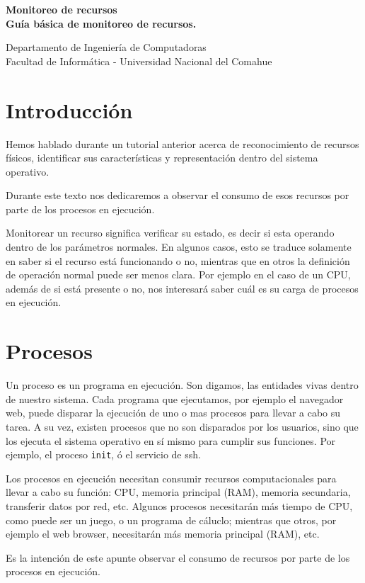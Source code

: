\documentclass[12pt]{article}
\def\maketitle{

 \makeatletter
 {\color{bl} \centering \huge \sc \textbf{
 Monitoreo de recursos \\ 
\large \vspace*{-8pt} \color{black} Guía básica de monitoreo de recursos. 
 \vspace*{8pt} }\par}
 \makeatother


 \makeatletter
 {\centering \small 
 	Departamento de Ingeniería de Computadoras \\
 	Facultad de Informática - Universidad Nacional del Comahue \\
 	\vspace{20pt} }
 \makeatother

}
\begin{document}
\thispagestyle{empty}
\maketitle
\setlength{\parindent}{0pt}

\section*{Introducción}

Hemos hablado durante un tutorial anterior acerca de reconocimiento de recursos 
físicos, identificar sus características y representación dentro del 
sistema operativo.

Durante este texto nos dedicaremos a observar el consumo de esos recursos 
por parte de los procesos en ejecución. 

Monitorear un recurso significa verificar su estado, es decir si esta 
operando dentro de los parámetros normales. En algunos casos, esto se 
traduce solamente en saber si el recurso está funcionando o no, mientras 
que en otros la definición de operación normal puede ser menos clara. 
Por ejemplo en el caso de un CPU, además de si está presente o no, nos 
interesará saber cuál es su carga de procesos en ejecución. 


\section*{Procesos}

Un proceso es un programa en ejecución. Son digamos, las entidades vivas 
dentro de nuestro sistema. Cada programa que ejecutamos, por ejemplo el 
navegador web, puede disparar la ejecución de uno o mas procesos para 
llevar a cabo su tarea.  A su vez, existen procesos que no son disparados 
por los usuarios, sino que los ejecuta el sistema operativo en sí mismo 
para cumplir sus funciones. Por ejemplo, el proceso \texttt{init}, ó el 
servicio de ssh. 

Los procesos en ejecución necesitan consumir recursos computacionales para 
llevar a cabo su función: CPU, memoria principal (RAM), memoria secundaria, 
transferir datos por red, etc. Algunos procesos necesitarán más tiempo de 
CPU, como puede ser un juego, o un programa de cáluclo; mientras que 
otros, por ejemplo el web browser, necesitarán más memoria principal 
(RAM), etc.

Es la intención de este apunte observar el consumo de recursos por parte de 
los procesos en ejecución. 
 
\end{document}
